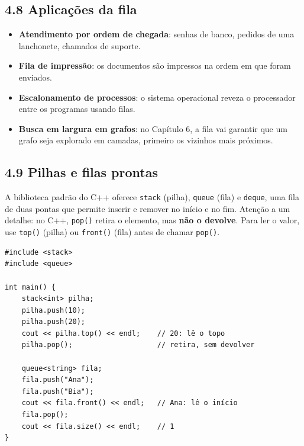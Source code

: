 \subsection{4.8 Aplicações da fila}

\begin{itemize}
  \item \textbf{Atendimento por ordem de chegada}: senhas de banco, pedidos de uma lanchonete, chamados de suporte.
  \item \textbf{Fila de impressão}: os documentos são impressos na ordem em que foram enviados.
  \item \textbf{Escalonamento de processos}: o sistema operacional reveza o processador entre os programas usando filas.
  \item \textbf{Busca em largura em grafos}: no Capítulo 6, a fila vai garantir que um grafo seja explorado em camadas, primeiro os vizinhos mais próximos.
\end{itemize}

\subsection{4.9 Pilhas e filas prontas}

A biblioteca padrão do C++ oferece \texttt{stack} (pilha), \texttt{queue} (fila) e \texttt{deque}, uma fila de duas pontas que permite inserir e remover no início e no fim. Atenção a um detalhe: no C++, \texttt{pop()} retira o elemento, mas \textbf{não o devolve}. Para ler o valor, use \texttt{top()} (pilha) ou \texttt{front()} (fila) antes de chamar \texttt{pop()}.

\begin{codigo}
\begin{Verbatim}[breaklines=true, breaksymbolleft={}, fontsize=\footnotesize]
#include <stack>
#include <queue>

int main() {
    stack<int> pilha;
    pilha.push(10);
    pilha.push(20);
    cout << pilha.top() << endl;    // 20: lê o topo
    pilha.pop();                    // retira, sem devolver

    queue<string> fila;
    fila.push("Ana");
    fila.push("Bia");
    cout << fila.front() << endl;   // Ana: lê o início
    fila.pop();
    cout << fila.size() << endl;    // 1
}
\end{Verbatim}
\end{codigo}

